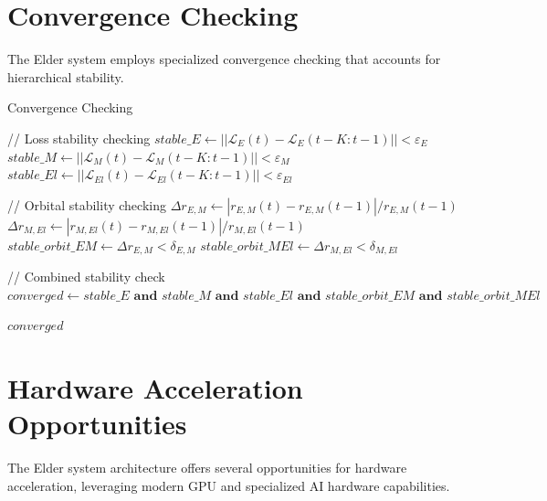 \section{Convergence Checking}

The Elder system employs specialized convergence checking that accounts for hierarchical stability.

\begin{algorithm}
\caption{Convergence Checking}
\begin{algorithmic}[1]
    \State // Loss stability checking
    \State $stable\_E \gets ||\mathcal{L}_E(t) - \mathcal{L}_E(t-K:t-1)|| < \varepsilon_E$
    \State $stable\_M \gets ||\mathcal{L}_M(t) - \mathcal{L}_M(t-K:t-1)|| < \varepsilon_M$
    \State $stable\_El \gets ||\mathcal{L}_{El}(t) - \mathcal{L}_{El}(t-K:t-1)|| < \varepsilon_{El}$
    
    \State // Orbital stability checking
    \State $\Delta r_{E,M} \gets |r_{E,M}(t) - r_{E,M}(t-1)|/r_{E,M}(t-1)$
    \State $\Delta r_{M,El} \gets |r_{M,El}(t) - r_{M,El}(t-1)|/r_{M,El}(t-1)$
    \State $stable\_orbit\_EM \gets \Delta r_{E,M} < \delta_{E,M}$
    \State $stable\_orbit\_MEl \gets \Delta r_{M,El} < \delta_{M,El}$
    
    \State // Combined stability check
    \State $converged \gets stable\_E \textbf{ and } stable\_M \textbf{ and } stable\_El \textbf{ and } stable\_orbit\_EM \textbf{ and } stable\_orbit\_MEl$
    
    \State \Return $converged$
\EndFunction
\end{algorithmic}
\end{algorithm}

\section{Hardware Acceleration Opportunities}

The Elder system architecture offers several opportunities for hardware acceleration, leveraging modern GPU and specialized AI hardware capabilities.

